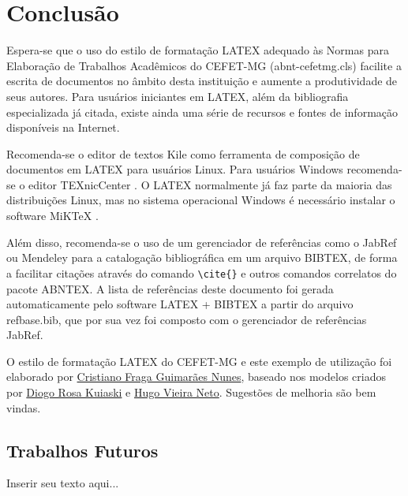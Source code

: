 %
%

\chapter{Conclusão}
\label{chap:conclusao}

Espera-se que o uso do estilo de formatação LATEX adequado às Normas para Elaboração de Trabalhos Acadêmicos do CEFET-MG ({\ttfamily abnt-cefetmg.cls}) facilite a escrita de documentos no âmbito desta instituição e aumente a produtividade de seus autores. Para usuários iniciantes em LATEX, além da bibliografia especializada já citada, existe ainda uma série de recursos \cite{CTAN2009} e fontes de informação \cite{TeX-Br2009,Wikibooks2009} disponíveis na Internet.

Recomenda-se o editor de textos Kile como ferramenta de composição de documentos em LATEX para usuários Linux. Para usuários Windows recomenda-se o editor TEXnicCenter \cite{TeXnicCenter2009}. O LATEX normalmente já faz parte da maioria das distribuições Linux, mas no sistema operacional Windows é necessário instalar o software MiKTeX \cite{MiKTeX2009}.

Além disso, recomenda-se o uso de um gerenciador de referências como o JabRef \cite{JabRef2009} ou Mendeley \cite{Mendeley2009} para a catalogação bibliográfica em um arquivo BIBTEX, de forma a facilitar citações através do comando \verb#\cite{}# e outros comandos correlatos do pacote ABNTEX. A lista de referências deste documento foi gerada automaticamente pelo software LATEX + BIBTEX a partir do arquivo {\ttfamily refbase.bib}, que por sua vez foi composto com o gerenciador de referências JabRef.

O estilo de formatação LATEX do CEFET-MG e este exemplo de utilização foi elaborado por
\href{mailto:cfgnunes@gmail.com}{Cristiano Fraga Guimarães Nunes},
baseado nos modelos criados por
\href{mdiogo.kuiaski@gmail.com}{Diogo Rosa Kuiaski} e \href{hvieir@utfpr.edu.br}{Hugo Vieira Neto}. Sugestões de melhoria são bem vindas.

\section{Trabalhos Futuros}
\label{sec:trabalhosFuturos}

Inserir seu texto aqui...
